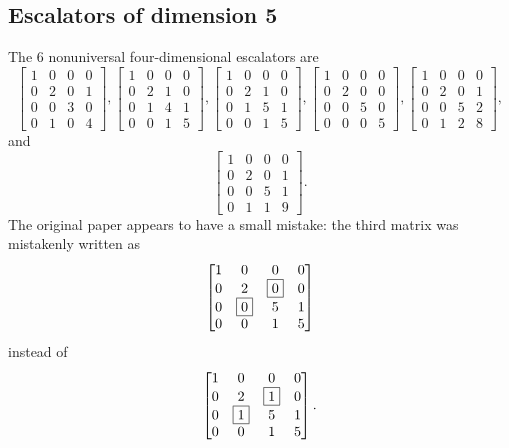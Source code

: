 \documentclass[letterpaper, 12pt]{article}
\begin{document}
\subsection{Escalators of dimension 5}\label{section:5 dim escalators}
The $6$ nonuniversal four-dimensional escalators are
\[\begin{bmatrix} 1 & 0 & 0 & 0 \\ 0 & 2 & 0 & 1 \\ 0 & 0 & 3 & 0 \\ 0 & 1 & 0 & 4 \end{bmatrix}, \begin{bmatrix} 1 & 0 & 0 & 0 \\ 0 & 2 & 1 & 0 \\ 0 & 1 & 4 & 1 \\ 0 & 0 & 1 & 5 \end{bmatrix}, \begin{bmatrix} 1 & 0 & 0 & 0 \\ 0 & 2 & 1 & 0 \\ 0 & 1 & 5 & 1 \\ 0 & 0 & 1 & 5 \end{bmatrix}, \begin{bmatrix} 1 & 0 & 0 & 0 \\ 0 & 2 & 0 & 0 \\ 0 & 0 & 5 & 0 \\ 0 & 0 & 0 & 5 \end{bmatrix}, \begin{bmatrix} 1 & 0 & 0 & 0 \\ 0 & 2 & 0 & 1 \\ 0 & 0 & 5 & 2 \\ 0 & 1 & 2 & 8 \end{bmatrix},\]
and
\[\begin{bmatrix} 1 & 0 & 0 & 0 \\ 0 & 2 & 0 & 1 \\ 0 & 0 & 5 & 1 \\ 0 & 1 & 1 & 9 \end{bmatrix}.\]
The original paper appears to have a small mistake: the third matrix was mistakenly written as
\[\begin{bmatrix} 1&0&0&0 \\ 0&2&\fbox0&0 \\ 0&\fbox0&5&1 \\ 0&0&1&5\end{bmatrix}\]
instead of
\[\begin{bmatrix} 1&0&0&0 \\ 0&2&\fbox1&0 \\ 0&\fbox1&5&1 \\ 0&0&1&5\end{bmatrix}.\]
\end{document}
